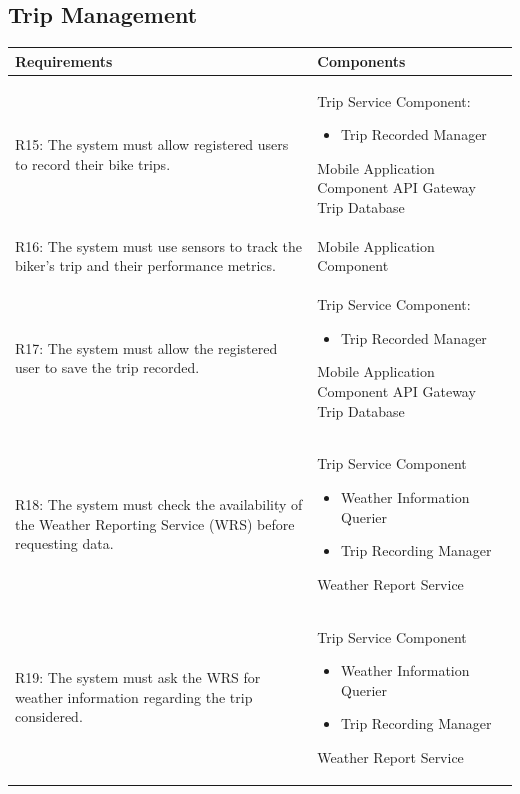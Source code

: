 \subsection{Trip Management}
\begin{table}[ht]
\begin{tabular}{|p{9cm}|p{6cm}|}
\hline
\textbf{Requirements}      & \multicolumn{1}{l|}{\textbf{Components}}\\ \hline
R15: The system must allow registered users to record their bike trips. 
&
Trip Service Component:
\begin{itemize}
    \item Trip Recorded Manager
\end{itemize}
Mobile Application Component
\newline
API Gateway
\newline
Trip Database
\\ \hline
R16: The system must use sensors to track the biker’s trip and their performance metrics.  
&
Mobile Application Component
\\ \hline
R17: The system must allow the registered user to save the trip recorded. 
&
Trip Service Component:
\begin{itemize}
    \item Trip Recorded Manager
\end{itemize}
Mobile Application Component
\newline
API Gateway
\newline
Trip Database
\\ \hline
R18: The system must check the availability of the Weather Reporting Service (WRS) before requesting data. 
&
Trip Service Component
\begin{itemize}
    \item Weather Information Querier
    \item Trip Recording Manager
\end{itemize}
Weather Report Service
\\ \hline
R19: The system must ask the WRS for weather information regarding the trip considered. 
&
Trip Service Component
\begin{itemize}
    \item Weather Information Querier
    \item Trip Recording Manager
\end{itemize}
Weather Report Service
\\ \hline
\end{tabular}
\end{table}
